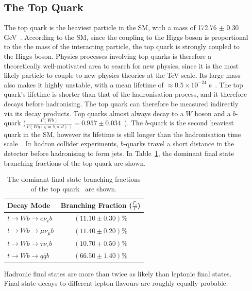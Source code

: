 \subsection{The Top Quark}
The top quark is the heaviest particle in the SM, with a mass of 172.76 $\pm$ 0.30 GeV~\cite{pdg}. According to the SM, since the coupling to the Higgs boson is proportional to the the mass of the interacting particle, the top quark is strongly coupled to the Higgs boson. Physics processes involving top quarks is therefore a theoretically well-motivated area to search for new physics, since it is the most likely particle to couple to new physics theories at the TeV scale. Its large mass also makes it highly unstable, with a mean lifetime of $\approx 0.5 \times 10^{-24}$ s~\cite{pdg}. The top quark's lifetime is shorter than that of the hadronisation process, and it therefore decays before hadronising. The top quark can therefore be measured indirectly via its decay products. Top quarks almost always decay to a $W$ boson and a $b$-quark ($\frac{\Gamma(Wb)}{\Gamma( Wq (q=b,s,d))} = 0.957\pm 0.034$~\cite{pdg}). The $b$-quark is the second heaviest quark in the SM, however its lifetime is still longer than the hadronisation time scale~\cite{pdg}. In hadron collider experiments, $b$-quarks travel a short distance in the detector before hadronising to form jets. In Table~\ref{tab:top-decay-modes}, the dominant final state branching fractions of the top quark are shown.

\begin{table}[h!]
\def\arraystretch{1.5}%
\begin{tabular}{l|c}
\hline
Decay Mode & Branching Fraction ($\frac{\Gamma_{i}}{\Gamma}$)\\ \hline
$t \rightarrow Wb \rightarrow e\nu_{e} b$           &      $(11.10\pm 0.30)\%$     \\
$t \rightarrow Wb \rightarrow \mu \nu_{\mu} b$             &   $(11.40\pm 0.20)\%$        \\
       $t \rightarrow Wb \rightarrow \tau \nu_{\tau} b$      &  $(10.70\pm 0.50)\%$         \\
  $t \rightarrow Wb\rightarrow q\bar{q} b$           &      $(66.50\pm 1.40)\%$     \\ \hline
\end{tabular}
\centering
\caption{The dominant final state branching fractions of the top quark~\cite{pdg} are shown.}
\label{tab:top-decay-modes}
\end{table}

\noindent
Hadronic final states are more than twice as likely than leptonic final states. Final state decays to different lepton flavours are roughly equally probable.\\

